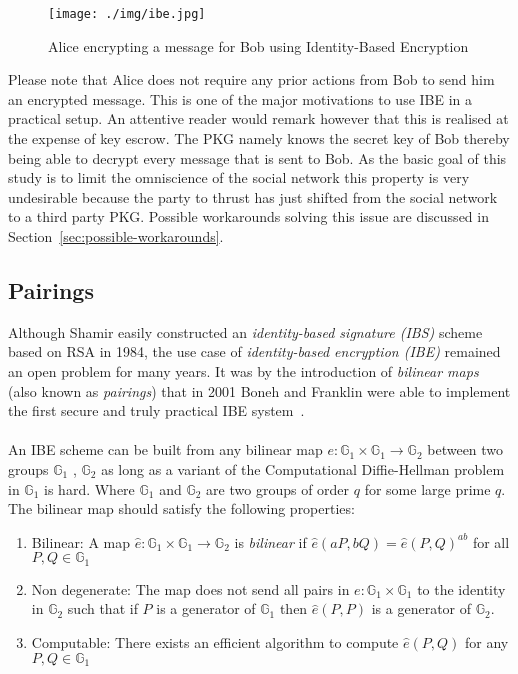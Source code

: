 \documentclass[journal]{IEEEtran}
\begin{document}
\begin{figure}[H]
  \centering
  \texttt{[image: ./img/ibe.jpg]}
  \caption{Alice encrypting a message for Bob using Identity-Based Encryption}
  \label{fig:ibe}
\end{figure}

Please note that Alice does not require any prior actions from Bob to send him
an encrypted message. This is one of the major motivations to use IBE in a
practical setup. An attentive reader would remark however that this is realised
at the expense of key escrow. The PKG namely knows the secret key of Bob thereby
being able to decrypt every message that is sent to Bob. As the basic goal of
this study is to limit the omniscience of the social network this property is
very undesirable because the party to thrust has just shifted from the social
network to a third party PKG. Possible workarounds solving this issue are
discussed in Section~\ref{sec:possible-workarounds}.

\subsection{Pairings}\label{sec:pairings}
Although Shamir easily constructed an \textit{identity-based signature (IBS)}
scheme based on RSA in 1984, the use case of \textit{identity-based encryption
(IBE)} remained an open problem for many years. It was by the introduction of
\textit{bilinear maps} (also known as \textit{pairings}) that in 2001 Boneh and
Franklin\cite{BonehFranklinIBE} were able to implement the first secure and
truly practical IBE system~\cite{Baek04asurvey}.\\
\\
An IBE scheme can be built from any bilinear map $e : \mathds{G}_1 \times
\mathds{G}_1 \rightarrow \mathds{G}_2$ between two groups $\mathds{G}_1$ ,
$\mathds{G}_2$ as long as a variant of the Computational Diffie-Hellman problem
in $\mathds{G}_1$ is hard. Where $\mathds{G}_1$ and $\mathds{G}_2$ are two
groups of order $q$ for some large prime $q$. The bilinear map should satisfy
the following properties:

\begin{enumerate}
 \item Bilinear: A map $\hat{e}: \mathds{G}_1 \times \mathds{G}_1 \rightarrow
\mathds{G}_2$ is \textit{bilinear} if $\hat{e} \left(aP,bQ \right) = \hat{e}
\left( P,Q\right)^{ab}$ for all $P,Q \in \mathds{G}_1$
 \item Non degenerate: The map does not send all pairs in $e : \mathds{G}_1
\times \mathds{G}_1$ to the identity in $\mathds{G}_2$  such that if $P$ is a
generator of $\mathds{G}_1$ then $\hat{e}\left(P,P\right)$ is a generator of
$\mathds{G}_2$.
 \item Computable: There exists an efficient algorithm to compute
$\hat{e}\left(P,Q\right)$ for any $P,Q \in \mathds{G}_1$
\end{enumerate}
\end{document}
